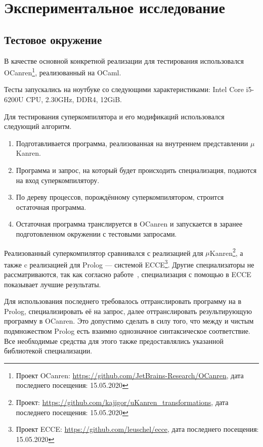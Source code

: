 \section{Экспериментальное исследование}
\label{sec:testing}

\subsection{Тестовое окружение}

В качестве основной конкретной реализации \ukanren для тестирования
использовался OCanren\footnote{Проект OCanren: \url{https://github.com/JetBrains-Research/OCanren}, дата последнего посещения: 15.05.2020}\cite{ocanren},
реализованный на OCaml\cite{ocanren}.

Тесты запускались на ноутбуке со следующими характеристиками: Intel Core i5-6200U CPU, 2.30GHz, DDR4, 12GiB.

Для тестирования суперкомпилятора и его модификаций использовался следующий алгоритм.
\begin{enumerate}
\item Подготавливается программа, реализованная на внутреннем представлении $\mu$Kanren.
\item Программа и запрос, на который будет происходить специализация, подаются на вход суперкомпилятору.
\item По дереву процессов, порождённому суперкомпилятором, строится остаточная программа.
\item Остаточная программа транслируется в OCanren и
      запускается в заранее подготовленном окружении с тестовыми запросами.
\end{enumerate}


Реализованный суперкомпилятор сравнивался с реализацией \forcpd для $\mu$Kanren\footnote{Проект: \url{https://github.com/kajigor/uKanren_transformations}, дата последнего посещения: 15.05.2020},
а также c реализацией \forcpd для Prolog --- системой ECCE\footnote{Проект ECCE: \url{https://github.com/leuschel/ecce}, дата последнего посещения: 15.05.2020}.
Другие специализаторы не рассматриваются, так как согласно работе~\cite{controlPoly}, специализация с
помощью \forcpd в ECCE показывает лучшие результаты.

Для использования последнего требовалось оттранслировать программу на \ukanren в Prolog, специализировать
её на запрос, далее оттранслировать результирующую программу в OCanren.
Это допустимо сделать в силу того, что между \ukanren и чистым подмножеством Prolog есть
взаимно однозначное синтаксическое соответствие. 
Все необходимые средства для этого также предоставлялись указанной библиотекой специализации.


